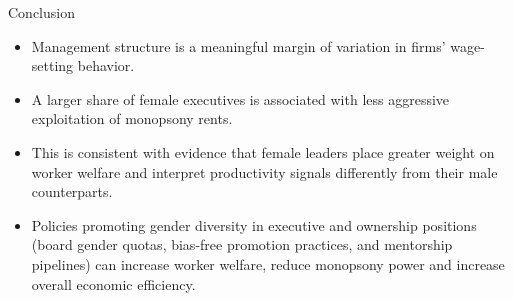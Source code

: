 \documentclass[11pt,aspectratio=169]{beamer}
\begin{document}
\begin{frame}{Conclusion}
\begin{itemize}
  \item Management structure is a meaningful margin of variation in firms' wage-setting behavior.
  \item A larger share of female executives is associated with less aggressive exploitation of monopsony rents.
  \item This is consistent with evidence that female leaders place greater weight on worker welfare and interpret productivity signals differently from their male counterparts.
  \item Policies promoting gender diversity in executive and ownership positions (board gender quotas, bias-free promotion practices, and mentorship pipelines) can increase worker welfare, reduce monopsony power and increase overall economic efficiency.
\end{itemize}
\end{frame}
\end{document}
